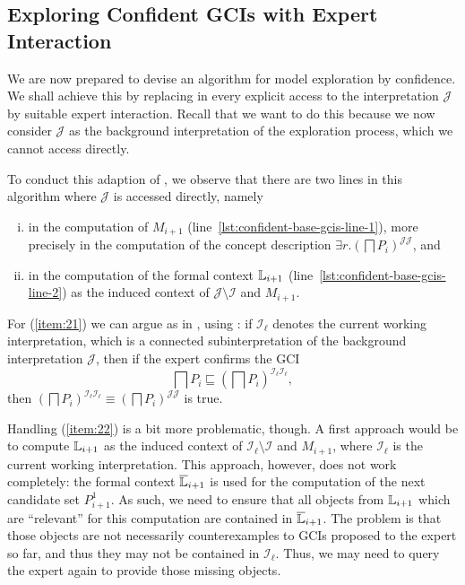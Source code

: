 \subsection{Exploring Confident GCIs with Expert Interaction}
\label{sec:expl-conf-gcis-1}

We are now prepared to devise an algorithm for model exploration by confidence.  We shall
achieve this by replacing in  every explicit
access to the interpretation $\mathcal{J}$ by suitable expert interaction.  Recall that we
want to do this because we now consider $\mathcal{J}$ as the background interpretation of
the exploration process, which we cannot access directly.

To conduct this adaption of , we observe
that there are two lines in this algorithm where $\mathcal{J}$ is accessed directly,
namely
\begin{enumerate}[i. ]
\item\label{item:21} in the computation of $M_{i+1}$
  (line~\ref{lst:confident-base-gcis-line-1}), more precisely in the computation of the
  concept description $\exists r.(\bigsqcap P_{i})^{\mathcal{J}\mathcal{J}}$, and
\item\label{item:22} in the computation of the formal context ${\mathbb{L}}_{i+1}$
  (line~\ref{lst:confident-base-gcis-line-2}) as the induced context of $\mathcal{J}
  \setminus \mathcal{I}$ and $M_{i+1}$.
\end{enumerate}

For (\ref{item:21}) we can argue as in , using
: if $\mathcal{I}_{\ell}$ denotes the current working interpretation,
which is a connected subinterpretation of the background interpretation $\mathcal{J}$,
then if the expert confirms the GCI
\begin{equation*}
  \bigsqcap P_{i} \sqsubseteq (\bigsqcap P_{i})^{\mathcal{I}_{\ell}\mathcal{I}_{\ell}},
\end{equation*}
then $(\bigsqcap P_{i})^{\mathcal{I}_{\ell}\mathcal{I}_{\ell}} \equiv (\bigsqcap
P_{i})^{\mathcal{J}\mathcal{J}}$ is true.

Handling (\ref{item:22}) is a bit more problematic, though.  A first approach would be to
compute ${\mathbb{L}}_{i+1}$ as the induced context of $\mathcal{I}_{\ell} \setminus
\mathcal{I}$ and $M_{i+1}$, where $\mathcal{I}_{\ell}$ is the current working
interpretation.  This approach, however, does not work completely: the formal context
$\overline{{\mathbb{L}}}_{i+1}$ is used for the computation of the next candidate set $P_{i+1}^{1}$.
As such, we need to ensure that all objects from ${\mathbb{L}}_{i+1}$ which are
\enquote{relevant} for this computation are contained in $\overline{{\mathbb{L}}}_{i+1}$.  The
problem is that those objects are not necessarily counterexamples to GCIs proposed to the
expert so far, and thus they may not be contained in $\mathcal{I}_{\ell}$.  Thus, we may
need to query the expert again to provide those missing objects.

